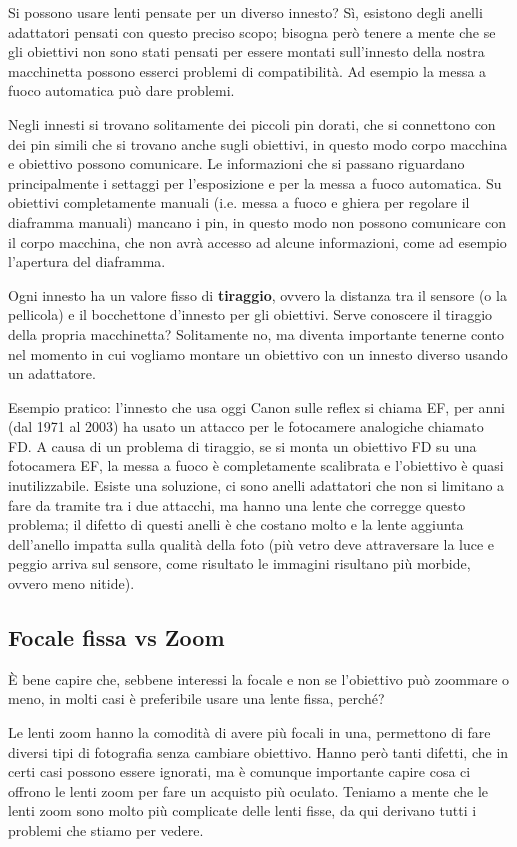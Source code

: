 Si possono usare lenti pensate per un diverso innesto? Sì, esistono degli anelli adattatori pensati con questo preciso scopo; bisogna però tenere a mente che se gli obiettivi non sono stati pensati per essere montati sull'innesto della nostra macchinetta possono esserci problemi di compatibilità.
Ad esempio la messa a fuoco automatica può dare problemi.

Negli innesti si trovano solitamente dei piccoli pin dorati, che si connettono con dei pin simili che si trovano anche sugli obiettivi, in questo modo corpo macchina e obiettivo possono comunicare.
Le informazioni che si passano riguardano principalmente i settaggi per l'esposizione e per la messa a fuoco automatica. Su obiettivi completamente manuali (i.e. messa a fuoco e ghiera per regolare il diaframma manuali) mancano i pin, in questo modo non possono comunicare con il corpo macchina, che non avrà accesso ad alcune informazioni, come ad esempio l'apertura del diaframma.

Ogni innesto ha un valore fisso di \textbf{tiraggio}, ovvero la distanza tra il sensore (o la pellicola) e il bocchettone d'innesto per gli obiettivi.
Serve conoscere il tiraggio della propria macchinetta? Solitamente no, ma diventa importante tenerne conto nel momento in cui vogliamo montare un obiettivo con un innesto diverso usando un adattatore.

Esempio pratico: l'innesto che usa oggi Canon sulle reflex si chiama EF, per anni (dal 1971 al 2003) ha usato un attacco per le fotocamere analogiche chiamato FD.
A causa di un problema di tiraggio, se si monta un obiettivo FD su una fotocamera EF, la messa a fuoco è completamente scalibrata e l'obiettivo è quasi inutilizzabile.
Esiste una soluzione, ci sono anelli adattatori che non si limitano a fare da tramite tra i due attacchi, ma hanno una lente che corregge questo problema; il difetto di questi anelli è che costano molto e la lente aggiunta dell'anello impatta sulla qualità della foto (più vetro deve attraversare la luce e peggio arriva sul sensore, come risultato le immagini risultano più morbide, ovvero meno nitide).

\subsection{Focale fissa vs Zoom} \label{subsec:primevszoom}
È bene capire che, sebbene interessi la focale e non se l'obiettivo può zoommare o meno, in molti casi è preferibile usare una lente fissa, perché?

Le lenti zoom hanno la comodità di avere più focali in una, permettono di fare diversi tipi di fotografia senza cambiare obiettivo. Hanno però tanti difetti, che in certi casi possono essere ignorati, ma è comunque importante capire cosa ci offrono le lenti zoom per fare un acquisto più oculato. Teniamo a mente che le lenti zoom sono molto più complicate delle lenti fisse, da qui derivano tutti i problemi che stiamo per vedere.

